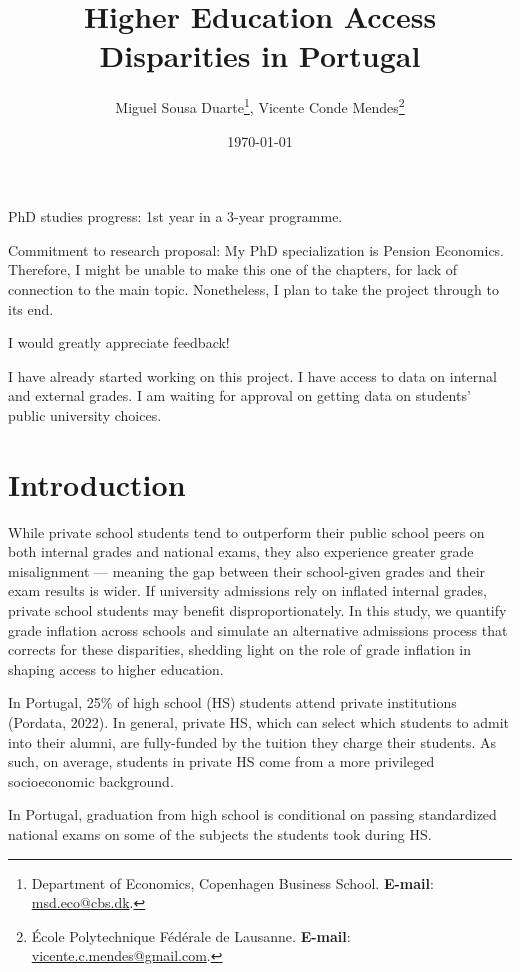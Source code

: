 \documentclass{article}
\begin{document}
\title{Higher Education Access Disparities in Portugal}
\author{Miguel Sousa Duarte\thanks{{\tiny{}Department of Economics, Copenhagen Business School. \textbf{E-mail}: \url{msd.eco@cbs.dk}.}},
Vicente Conde Mendes\thanks{{\tiny{}École Polytechnique Fédérale de Lausanne. \textbf{E-mail}: \url{vicente.c.mendes@gmail.com}.}}\\}

\date{\today}

\setlength{\parskip}{1em}
\maketitle
PhD studies progress: 1st year in a 3-year programme.

Commitment to research proposal: My PhD specialization is Pension Economics. Therefore, I might be unable to make this one of the chapters, for lack of connection to the main topic. Nonetheless, I plan to take the project through to its end.

I would greatly appreciate feedback!

I have already started working on this project. I have access to data on internal and external grades. I am waiting for approval on getting data on students' public university choices.


\newpage

\section{Introduction}
While private school students tend to outperform their public school peers on both internal grades and national exams, they also experience greater grade misalignment — meaning the gap between their school-given grades and their exam results is wider. If university admissions rely on inflated internal grades, private school students may benefit disproportionately. In this study, we quantify grade inflation across schools and simulate an alternative admissions process that corrects for these disparities, shedding light on the role of grade inflation in shaping access to higher education.

In Portugal, 25\% of high school (HS) students attend private institutions (Pordata, 2022). In general, private HS, which can select which students to admit into their alumni, are fully-funded by the tuition they charge their students. As such, on average, students in private HS come from a more privileged socioeconomic background. 

In Portugal, graduation from high school is conditional on passing standardized national exams on some of the subjects the students took during HS. 
\end{document}
